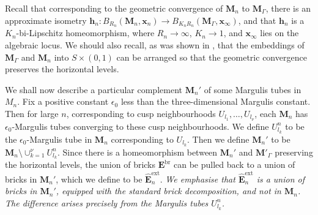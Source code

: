 \documentclass{amsart}
\theoremstyle{definition}
\begin{document}
Recall that corresponding to the geometric convergence of $\mathbf M_n$ to $\mathbf M_\Gamma$, there is an approximate isometry $\mathbf h_n\colon B_{R_n}(\mathbf M_n, \mathbf x_n) \rightarrow B_{K_n R_n}(\mathbf M_\Gamma, \mathbf x_\infty)$, and that $\mathbf h_n$ is a $K_n$-bi-Lipschitz homeomorphism, where $R_n \rightarrow \infty$, $K_n \rightarrow 1$, and $\mathbf x_\infty$ lies on the algebraic locus.
We should also recall, as was shown in \cite[Lemma 9.2]{OhD}, that the embeddings of $\mathbf M_\Gamma$ and $\mathbf M_n$ into $S \times (0,1)$ can be arranged so that the geometric convergence preserves the horizontal levels.

We shall now describe a particular complement $\mathbf M_n'$ of some Margulis tubes in $M_n$. 
Fix a positive constant $\epsilon_0$ less than the three-dimensional Margulis constant.
Then for large $n$, corresponding to cusp neighbourhoods $U_{l_1}, \dots , U_{l_\nu}$, each $\mathbf M_n$ has $\epsilon_0$-Margulis tubes converging to these cusp neighbourhoods.
We define $U^n_{l_k}$ to be the $\epsilon_0$-Margulis tube in $\mathbf M_n$ corresponding to $U_{l_k}$.
Then we define $\mathbf M_n'$ to be $\mathbf M_n \setminus \cup_{k=1}^\nu U^n_{l_k}$.
Since there is a homeomorphism between $\mathbf M_n'$  and $\mathbf M'_\Gamma$ preserving the horizontal levels, the union of bricks ${\mathbf E}^\mathrm{br}$ can be pulled back to a union of bricks in $\mathbf M_n'$, which we define to be $\widehat{\mathbf E}_n^\mathrm{ext}$. {\it We emphasise that $\widehat{\mathbf E}_n^\mathrm{ext}$ is a union of bricks in $\mathbf M_n'$, equipped with the standard brick decomposition, and not in $\mathbf M_n$. The difference arises precisely
	from the Margulis tubes $U^n_{l_k}$.}








\end{document}
